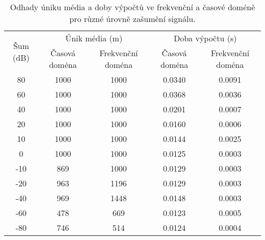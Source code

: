 \begin{table}[htb]
    \centering

    \begin{tabular}{ccccc}
        \toprule

        \multirow{2}{*}{Šum (dB)}   & \multicolumn{2}{c}{Únik média (m)}    & \multicolumn{2}{c}{Doba výpočtu (s)}  \\ \cmidrule(lr){2-3} \cmidrule(lr){4-5}
                                    & Časová doména	& Frekvenční doména     & Časová doména	& Frekvenční doména	    \\ \midrule

        80                          & 1000          & 1000                  & 0.0340        & 0.0091                \\
        60                          & 1000          & 1000                  & 0.0368        & 0.0036                \\
        40                          & 1000          & 1000                  & 0.0201        & 0.0007                \\
        20                          & 1000          & 1000                  & 0.0160        & 0.0006                \\
        10                          & 1000          & 1000                  & 0.0144        & 0.0025                \\
        0                           & 1000          & 1000                  & 0.0125        & 0.0003                \\
        -10                         & 869           & 1000                  & 0.0129        & 0.0003                \\
        -20                         & 963           & 1196                  & 0.0129        & 0.0003                \\
        -40                         & 969           & 1448                  & 0.0148        & 0.0003                \\
        -60                         & 478           & 669                   & 0.0123        & 0.0005                \\
        -80                         & 746           & 514                   & 0.0124        & 0.0004                \\

        \bottomrule
    \end{tabular}

    \caption{Odhady úniku média a doby výpočtů ve frekvenční a časové doméně pro různé úrovně zašumění signálu.}
    \label{table:table1}
\end{table}
\FloatBarrier

